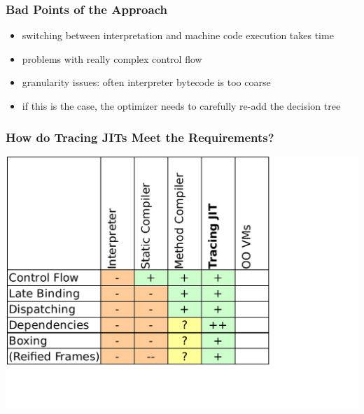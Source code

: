 \documentclass[utf8x]{beamer}
\begin{document}
\begin{frame}
    \frametitle{Bad Points of the Approach}
    \begin{itemize}
        \item switching between interpretation and machine code execution takes time
        \item problems with really complex control flow
        \item granularity issues: often interpreter bytecode is too coarse
        \item if this is the case, the optimizer needs to carefully re-add the decision tree
    \end{itemize}
\end{frame}

\begin{frame}
  \frametitle{How do Tracing JITs Meet the Requirements?}
  \includegraphics[scale=0.6]{figures/output4.pdf}
\end{frame}
\end{document}
